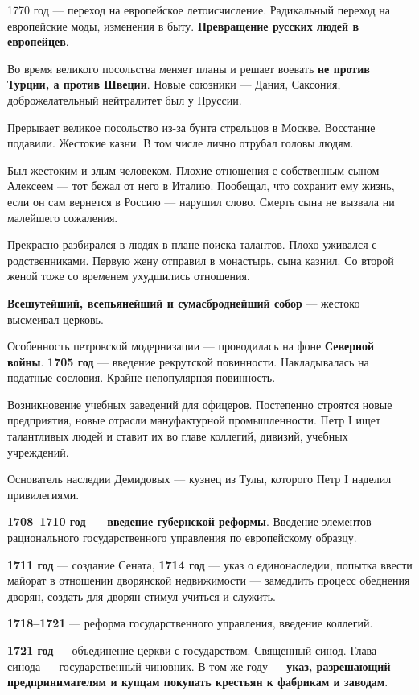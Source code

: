 \documentclass{article}
\begin{document}
1770 год — переход на европейское летоисчисление. Радикальный переход на европейские моды, изменения в быту. \textbf{Превращение русских людей в европейцев}.

\hfill

Во время великого посольства меняет планы и решает воевать \textbf{не против Турции, а против Швеции}. Новые союзники — Дания, Саксония, доброжелательный нейтралитет был у Пруссии.

Прерывает великое посольство из-за бунта стрельцов в Москве. Восстание подавили. Жестокие казни. В том числе лично отрубал головы людям.

Был жестоким и злым человеком. Плохие отношения с собственным сыном Алексеем — тот бежал от него в Италию. Пообещал, что сохранит ему жизнь, если он сам вернется в Россию — нарушил слово. Смерть сына не вызвала ни малейшего сожаления.

Прекрасно разбирался в людях в плане поиска талантов. Плохо уживался с родственниками. Первую жену отправил в монастырь, сына казнил. Со второй женой тоже со временем ухудшились отношения.


\hfill

\textbf{Всешутейший, всепьянейший и сумасброднейший собор} — жестоко высмеивал церковь.

Особенность петровской модернизации — проводилась на фоне \textbf{Северной войны}. \textbf{1705 год} — введение рекрутской повинности. Накладывалась на податные сословия. Крайне непопулярная повинность.

Возникновение учебных заведений для офицеров. Постепенно строятся новые предприятия, новые отрасли мануфактурной промышленности. Петр I ищет талантливых людей и ставит их во главе коллегий, дивизий, учебных учреждений.

Основатель наследии Демидовых — кузнец из Тулы, которого Петр I наделил привилегиями.

\hfill

\textbf{1708–1710 год — введение губернской реформы}. Введение элементов рационального государственного управления по европейскому образцу.

\textbf{1711 год} — создание Сената, \textbf{1714 год} — указ о единонаследии, попытка ввести майорат в отношении дворянской недвижимости — замедлить процесс обеднения дворян, создать для дворян стимул учиться и служить.

\textbf{1718–1721} — реформа государственного управления, введение коллегий.

\textbf{1721 год} — объединение церкви с государством. Священный синод. Глава синода — государственный чиновник. В том же году — \textbf{указ, разрешающий предпринимателям и купцам покупать крестьян к фабрикам и заводам}.
\end{document}
